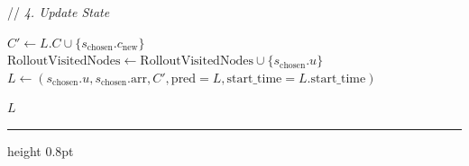 \documentclass{article}
\newcommand{\CommentLine}[1]{
    \State // \textit{#1}
}
\begin{document}
\begin{algorithmic}[1]
        \vspace{0.5em}
        \CommentLine{4. Update State}
        \State $C' \leftarrow L.C \cup \{s_{\text{chosen}}.c_{\text{new}}\}$
        \State $\text{RolloutVisitedNodes} \leftarrow \text{RolloutVisitedNodes} \cup \{s_{\text{chosen}}.u\}$
        \State $L \leftarrow (s_{\text{chosen}}.u, s_{\text{chosen}}.\text{arr}, C', \text{pred}=L, \text{start\_time}=L.\text{start\_time})$


    \State \Return $L$

\end{algorithmic}

\hrule height 0.8pt
\end{document}
